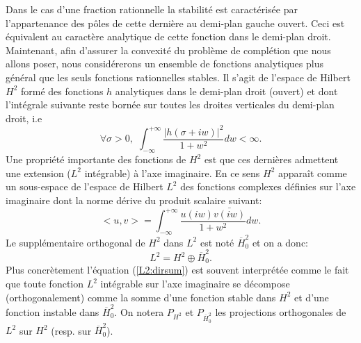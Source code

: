 \documentclass[12]{article}
\newcommand{\HHb}{\overline{H}^2_0}
\begin{document}
Dans le cas d'une fraction rationnelle la stabilit\'e est
caract\'eris\'ee par l'appartenance des p\^oles de cette derni\`ere au
demi-plan gauche ouvert. Ceci est \'equivalent au caract\`ere analytique de cette fonction 
dans le demi-plan droit. Maintenant, afin d'assurer la convexit\'e du
probl\`eme de compl\'etion que nous allons poser, nous consid\'ererons un ensemble de 
fonctions analytiques plus g\'en\'eral que les seuls fonctions
rationnelles stables. Il s'agit de l'espace de Hilbert $H^2$ form\'e des
fonctions $h$ analytiques dans le demi-plan droit (ouvert) et dont l'int\'egrale
suivante reste born\'ee sur toutes les droites verticales du demi-plan droit, i.e
\begin{equation}
\label{h2:def}
\forall \sigma>0,\,\,\int_{-\infty}^{+\infty}
\frac{|h(\sigma+iw)|^2}{1+w^2}dw < \infty.
\end{equation}
Une propri\'et\'e importante des fonctions de $H^2$ est que ces
derni\`eres admettent une extension ($L^2$ int\'egrable) \`a 
l'axe imaginaire. En ce sens $H^2$ appara\^it comme un sous-espace de
l'espace de Hilbert $L^2$ des fonctions complexes d\'efinies sur l'axe imaginaire
dont la norme d\'erive du produit scalaire suivant:
$$
<u,v>=\int_{-\infty}^{+\infty} \frac{u(iw) \bar{v(iw)}}{1+w^2}dw.
$$   
Le suppl\'ementaire orthogonal de $H^2$ dans $L^2$ est not\'e $\HHb$ et on a donc:
\begin{equation}
\label{L2:dirsum}
 L^2=H^2 \oplus  \HHb. 
\end{equation} 
Plus concr\`etement l'\'equation (\ref{L2:dirsum}) est souvent
interpr\'et\'ee comme le fait que toute fonction $L^2$ int\'egrable sur
l'axe imaginaire se d\'ecompose (orthogonalement) comme la somme d'une
fonction stable dans $H^2$ et d'une fonction instable dans $\HHb$.
On notera $P_{H^2}$ et $P_{\HHb}$ les projections orthogonales de
$L^2$ sur $H^2$ (resp. sur $\HHb$).
\end{document}
